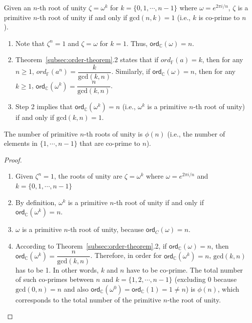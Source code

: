 \begin{tcolorbox}[title={\textbf{\tboxtheorem{\ref*{subsec:roots-theorem}.4} Condition for Primitive $\bm{n}$-th Roots of Unity}}]
Given an $n$-th root of unity $\zeta = \omega^k$ for $k = \{0, 1, \cdots, n-1\}$ where $\omega = e^{2\pi i/n}$, $\zeta$ is a primitive $n$-th root of unity if and only if $\text{gcd}(n, k) = 1$ (i.e., $k$ is co-prime to $n$).
\end{tcolorbox}
\begin{myproof}
    \begin{enumerate}
    \item Note that $\zeta^n = 1$ and $\zeta = \omega$ for $k = 1$. Thus, $\textsf{ord}_\mathbb{C}(\omega) = n$.
    \item Theorem~\ref*{subsec:order-theorem}.2 states that if $ord_\mathbb{F}(a) = k$, then for any $n \geq 1$, $ord_\mathbb{F}(a^n) = \dfrac{k}{\text{gcd}(k,n)}$. Similarly, if $\textsf{ord}_\mathbb{C}(\omega) = n$, then for any $k \geq 1$, $\textsf{ord}_\mathbb{C}(\omega^k) = \dfrac{n}{\text{gcd}(k, n)}$.
    \item Step 2 implies that $\textsf{ord}_\mathbb{C}(\omega^k) = n$ (i.e., $\omega^k$ is a primitive $n$-th root of unity) if and only if $\text{gcd}(k, n) = 1$.
    \end{enumerate}
\end{myproof}

\begin{tcolorbox}[title={\textbf{\tboxtheorem{\ref*{subsec:roots-theorem}.5} The number of Primitive $\bm{n}$-th Roots of Unity}}]
The number of primitive $n$-th roots of unity is $\phi(n)$ (i.e., the number of elements in $\{1, \cdots, n-1 \}$ that are co-prime to $n$).
\end{tcolorbox}

\begin{proof}
$ $
\begin{enumerate}
\item Given $\zeta^n = 1$, the roots of unity are $\zeta = \omega^k$ where $\omega = e^{2\pi i/n}$ and $k = \{0, 1, \cdots, n-1\}$ 
\item By definition, $\omega^k$ is a primitive $n$-th root of unity if and only if $\textsf{ord}_\mathbb{C}(\omega^k) = n$. 
\item $\omega$ is a primitive $n$-th root of unity, because $\textsf{ord}_C(\omega) = n$. 
\item According to Theorem~\ref*{subsec:order-theorem}.2, if $\textsf{ord}_\mathbb{C}(\omega) = n$, then $\textsf{ord}_\mathbb{C}(\omega^k) = \dfrac{n}{\text{gcd}(k,n)}$. Therefore, in order for $\textsf{ord}_\mathbb{C}(\omega^k) = n$, $\text{gcd}(k,n)$ has to be 1. In other words, $k$ and $n$ have to be co-prime.
The total number of such co-primes between $n$ and $k = \{1, 2, \cdots, n-1\}$ (excluding 0 because $\text{gcd}(0, n)= n$ and also $\textsf{ord}_\mathbb{C}(\omega^0) = \textsf{ord}_\mathbb{C}(1) = 1 \neq n$) is $\phi(n)$, which corresponds to the total number of the primitive $n$-the root of unity.
\end{enumerate}
\end{proof}
